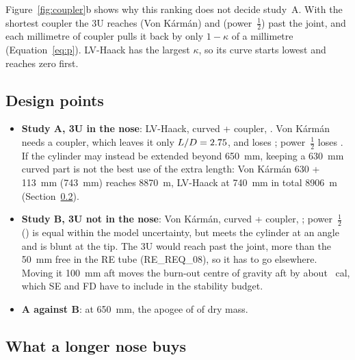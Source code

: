 Figure~\ref{fig:coupler}b shows why this ranking does not decide study~A. With the shortest
coupler the 3U reaches \TLOutVKP{} (Von K\'arm\'an) and \TLOutPHP{} (power~$\tfrac12$) past the
joint, and each millimetre of coupler pulls it back by only $1-\kappa$ of a millimetre
(Equation~\ref{eq:p}). LV-Haack has the largest $\kappa$, so its curve starts lowest and reaches
zero first.

\subsection{Design points}

\begin{table}[H]
\centering
\caption{Design point of each profile in each study at \SI{650}{mm}. ``3U in $L$'': length of the
curved part with $r\geq\SI{77}{mm}$; $p$: 3U past the joint (in study~B, where it would reach if it
were in the nose). Bold: best, or within \SI{10}{m} of the best.}
\label{tab:designs}
\small

\end{table}

\begin{itemize}[leftmargin=*,itemsep=2pt]
\item \textbf{Study A, 3U in the nose}: LV-Haack, \TLInLVHL{} curved + \TLInLVHC{} coupler,
\TLInLVHD. Von K\'arm\'an needs a \TLInVKC{} coupler, which leaves it only $L/D = 2.75$, and
loses \TLGAPVK; power~$\tfrac12$ loses \TLGAPPH. If the cylinder may instead be extended beyond
\SI{650}{mm}, keeping a \SI{630}{mm} curved part is not the best use of the extra length: Von
K\'arm\'an 630 + \SI{113}{mm} (\SI{743}{mm}) reaches \SI{8870}{m}, LV-Haack at \SI{740}{mm} in
total \SI{8906}{m} (Section~\ref{sec:length}).
\item \textbf{Study B, 3U not in the nose}: Von K\'arm\'an, \TLOutVKL{} curved + \TLOutVKC{}
coupler, \TLOutVKD; power~$\tfrac12$ (\TLOutPHD) is equal within the model uncertainty, but meets the
cylinder at an angle and is blunt at the tip. The 3U would reach \TLOutVKP{} past the joint, more
than the \SI{50}{mm} free in the RE tube (RE\_REQ\_08), so it has to go elsewhere. Moving it
\SI{100}{mm} aft moves the burn-out centre of gravity aft by about \TLGRVSM~cal, which SE and FD
have to include in the stability budget.
\item \textbf{A against B}: \TLAB{} at \SI{650}{mm}, the apogee of \TLABKG{} of dry mass.
\end{itemize}

\subsection{What a longer nose buys}
\label{sec:length}

